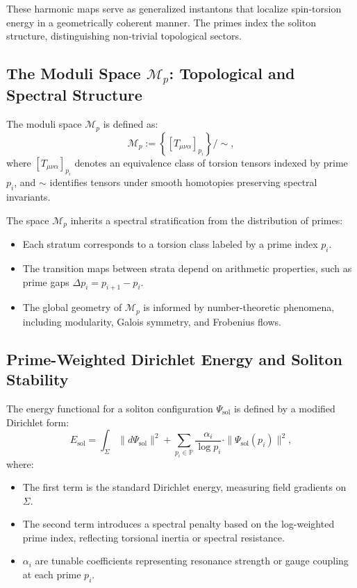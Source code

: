 \documentclass{article}
\theoremstyle{plain}
\begin{document}
These harmonic maps serve as generalized instantons that localize spin-torsion energy in a geometrically coherent manner. The primes index the soliton structure, distinguishing non-trivial topological sectors.

\subsection{The Moduli Space \texorpdfstring{$\mathcal{M}_p$}{Mp}: Topological and Spectral Structure}

The moduli space $\mathcal{M}_p$ is defined as:
\[
\mathcal{M}_p := \left\{ [T_{\mu\nu\alpha}]_{p_i} \right\} / \sim,
\]
where $[T_{\mu\nu\alpha}]_{p_i}$ denotes an equivalence class of torsion tensors indexed by prime $p_i$, and $\sim$ identifies tensors under smooth homotopies preserving spectral invariants.

The space $\mathcal{M}_p$ inherits a spectral stratification from the distribution of primes:
\begin{itemize}
    \item Each stratum corresponds to a torsion class labeled by a prime index $p_i$.
    \item The transition maps between strata depend on arithmetic properties, such as prime gaps $\Delta p_i = p_{i+1} - p_i$.
    \item The global geometry of $\mathcal{M}_p$ is informed by number-theoretic phenomena, including modularity, Galois symmetry, and Frobenius flows.
\end{itemize}

\subsection{Prime-Weighted Dirichlet Energy and Soliton Stability}

The energy functional for a soliton configuration $\Psi_{\text{sol}}$ is defined by a modified Dirichlet form:
\[
E_{\text{sol}} = \int_\Sigma \|d\Psi_{\text{sol}}\|^2 + \sum_{p_i \in \mathbb{P}} \frac{\alpha_i}{\log p_i} \cdot \|\Psi_{\text{sol}}(p_i)\|^2,
\]
where:
\begin{itemize}
    \item The first term is the standard Dirichlet energy, measuring field gradients on $\Sigma$.
    \item The second term introduces a spectral penalty based on the log-weighted prime index, reflecting torsional inertia or spectral resistance.
    \item $\alpha_i$ are tunable coefficients representing resonance strength or gauge coupling at each prime $p_i$.
\end{itemize}
\end{document}
